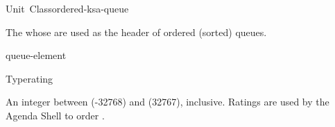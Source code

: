\documentclass[10pt,twoside,english,pdftex]{article}
\begin{document}

\begin{functiondoc}{Unit~Class}{ordered-ksa-queue}{}
%
%

\fnsyntax

\fnpackage {}

\fnmodule {}

\fndescription The  whose  are used as
the header of ordered (sorted)  queues.

\begin{alsos}{queue-element}
\also[queue]
\end{alsos}

\end{functiondoc}


\begin{functiondoc}{Type}{rating}{}
%

\fnsyntax

\fnpackage {}

\fnmodule {}

\fndescription An integer between  (-32768)
and  (32767), inclusive. Ratings are used
by the Agenda Shell to order .

\end{functiondoc}

\end{document}
